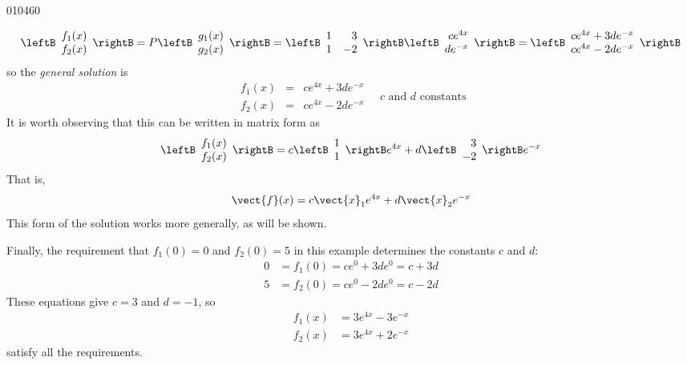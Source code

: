\begin{example}{}{010460}
\begin{solution}
\begin{equation*}
\leftB \begin{array}{c}
f_1(x) \\
f_2(x)
\end{array}\rightB = 
P \leftB \begin{array}{c}
g_1(x) \\
g_2(x)
\end{array}\rightB
= \leftB \begin{array}{rr}
1 & 3 \\
1 & -2
\end{array}\rightB
\leftB \begin{array}{r}
ce^{4x} \\
de^{-x}
\end{array}\rightB
= \leftB \begin{array}{r}
ce^{4x} + 3de^{-x}\\
ce^{4x} -2de^{-x}
\end{array}\rightB
\end{equation*}
so the \textit{general solution} is
\begin{equation*}
\begin{array}{lrr}
f_1(x) & = &ce^{4x} + 3de^{-x}  \\
f_2(x) & = &ce^{4x} - 2de^{-x}  
\end{array}
\quad  c \mbox{ and } d \mbox{ constants}
\end{equation*} 
It is worth observing that this can be written in matrix form as
\begin{equation*}
\leftB \begin{array}{c}
f_1(x) \\
f_2(x)
\end{array}\rightB = c \leftB \begin{array}{c}
1 \\
1
\end{array}\rightB e^{4x} + d \leftB \begin{array}{r}
3 \\
-2
\end{array}\rightB e^{-x}
\end{equation*}
That is,
\begin{equation*}
\vect{f}(x) = c\vect{x}_1 e^{4x} + d \vect{x}_2 e^{-x}
\end{equation*}
This form of the solution works more generally, as will be shown.


Finally, the requirement that $f_{1}(0) = 0$ and $f_{2}(0) = 5$ in this example determines the constants $c$ and $d$:
\begin{align*}
0 & = f_1(0) = ce^0 + 3de^0 = c+3d \\
5 & = f_2(0) = ce^0 - 2de^0 = c-2d
\end{align*}
These equations give $c = 3$ and $d = -1$, so
\begin{align*}
f_1(x) &= 3e^{4x}- 3e^{-x} \\
f_2(x) &= 3e^{4x} +2e^{-x}
\end{align*}
satisfy all the requirements.
\end{solution}
\end{example}

